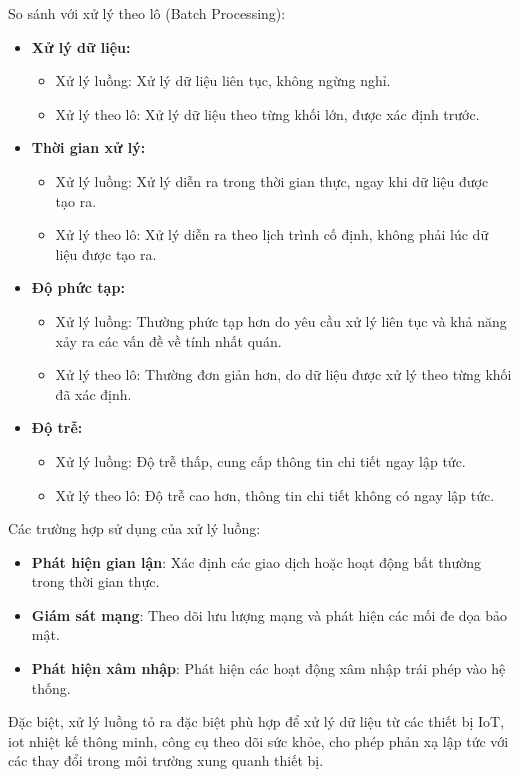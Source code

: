 So sánh với xử lý theo lô (Batch Processing):
\begin{itemize}
    \item \textbf{Xử lý dữ liệu:}
          \begin{itemize}
              \item Xử lý luồng: Xử lý dữ liệu liên tục, không ngừng nghỉ.
              \item Xử lý theo lô: Xử lý dữ liệu theo từng khối lớn, được xác định trước.
          \end{itemize}
    \item \textbf{Thời gian xử lý:}
          \begin{itemize}
              \item Xử lý luồng: Xử lý diễn ra trong thời gian thực, ngay khi dữ liệu được tạo ra.
              \item Xử lý theo lô: Xử lý diễn ra theo lịch trình cố định, không phải lúc dữ liệu được tạo ra.
          \end{itemize}
    \item \textbf{Độ phức tạp:}
          \begin{itemize}
              \item Xử lý luồng: Thường phức tạp hơn do yêu cầu xử lý liên tục và khả năng xảy ra các vấn đề về tính nhất quán.
              \item Xử lý theo lô: Thường đơn giản hơn, do dữ liệu được xử lý theo từng khối đã xác định.
          \end{itemize}
    \item \textbf{Độ trễ:}
          \begin{itemize}
              \item Xử lý luồng: Độ trễ thấp, cung cấp thông tin chi tiết ngay lập tức.
              \item Xử lý theo lô: Độ trễ cao hơn, thông tin chi tiết không có ngay lập tức.
          \end{itemize}
\end{itemize}

Các trường hợp sử dụng của xử lý luồng:
\begin{itemize}
    \item \textbf{Phát hiện gian lận}: Xác định các giao dịch hoặc hoạt động bất thường trong thời gian thực.
    \item \textbf{Giám sát mạng}: Theo dõi lưu lượng mạng và phát hiện các mối đe dọa bảo mật.
    \item \textbf{Phát hiện xâm nhập}: Phát hiện các hoạt động xâm nhập trái phép vào hệ thống.
\end{itemize}
Đặc biệt, xử lý luồng tỏ ra đặc biệt phù hợp để xử lý dữ liệu từ các thiết bị IoT, \gls{iot} nhiệt kế thông minh, công cụ theo dõi sức khỏe, cho phép phản xạ lập tức với các thay đổi trong môi trường xung quanh thiết bị.

